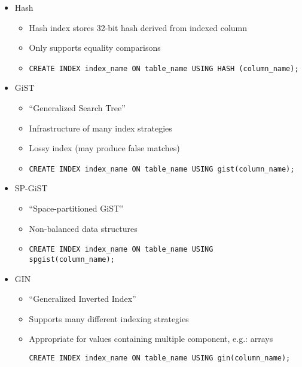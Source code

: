 \documentclass[11pt]{scrartcl}
\begin{document}
\begin{itemize}
  \item Hash \cite{PostgreSQL2024IndexTypes}
  \begin{itemize}
    \item Hash index stores 32-bit hash derived from indexed column
    \item Only supports equality comparisons
    \item  \begin{lstlisting}[style=dbtsql]
CREATE INDEX index_name ON table_name USING HASH (column_name);
             \end{lstlisting}
  \end{itemize}
  \item GiST \cite{PostgreSQL2024IndexTypes} \cite{PostgreSQL2024GistGin}
  \begin{itemize}
    \item \enquote{Generalized Search Tree}
    \item Infrastructure of many index strategies
    \item Lossy index (may produce false matches)
    \item \begin{lstlisting}[style=dbtsql]
CREATE INDEX index_name ON table_name USING gist(column_name);
    \end{lstlisting}
  \end{itemize}
  \item SP-GiST \cite{PostgreSQL2024IndexTypes}
  \begin{itemize}
    \item \enquote{Space-partitioned GiST}
    \item Non-balanced data structures
    \item \begin{lstlisting}[style=dbtsql]
CREATE INDEX index_name ON table_name USING spgist(column_name);
\end{lstlisting}
  \end{itemize}
  \item GIN \cite{PostgreSQL2024IndexTypes} \cite{PostgreSQL2024GistGin}
  \begin{itemize}
    \item \enquote{Generalized Inverted Index}
    \item Supports many different indexing strategies
    \item Appropriate for values containing multiple component, e.g.: arrays
    \begin{lstlisting}[style=dbtsql]
CREATE INDEX index_name ON table_name USING gin(column_name);

\end{lstlisting}
\end{itemize}
\end{itemize}
\end{document}

